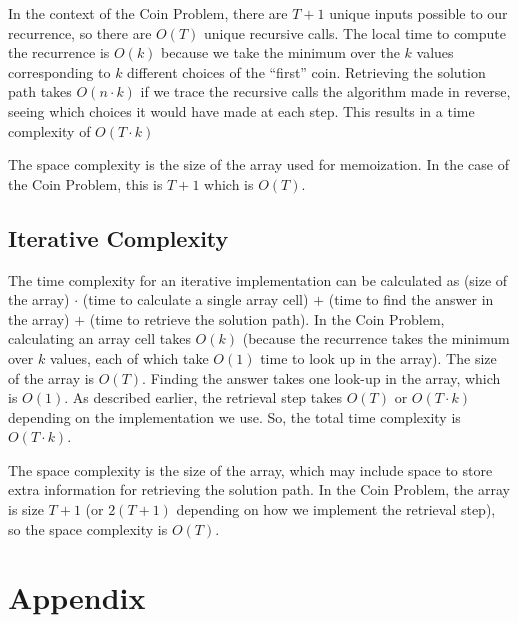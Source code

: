 \documentclass[11pt]{article}
\DeclareRobustCommand{\bigO}{%
    O
}
\begin{document}
In the context of the Coin Problem, there are $T+1$ unique inputs possible to our recurrence, so there are $\bigO(T)$ unique recursive calls. The local time to compute the recurrence is $\bigO(k)$ because we take the minimum over the $k$ values corresponding to $k$ different choices of the ``first'' coin. Retrieving the solution path takes $\bigO(n \cdot k)$ if we trace the recursive calls the algorithm made in reverse, seeing which choices it would have made at each step. This results in a time complexity of $\bigO(T \cdot k)$

The space complexity is the size of the array used for memoization. In the case of the Coin Problem, this is $T+1$ which is $\bigO(T)$.

\subsection*{Iterative Complexity}
The time complexity for an iterative implementation can be calculated as (size of the array) $\cdot$ (time to calculate a single array cell) $+$ (time to find the answer in the array) $+$ (time to retrieve the solution path). In the Coin Problem, calculating an array cell takes $\bigO(k)$ (because the recurrence takes the minimum over $k$ values, each of which take $\bigO(1)$ time to look up in the array). The size of the array is $\bigO(T)$. Finding the answer takes one look-up in the array, which is $\bigO(1)$. As described earlier, the retrieval step takes $\bigO(T)$ or $\bigO(T \cdot k)$ depending on the implementation we use. So, the total time complexity is $\bigO(T \cdot k)$.

The space complexity is the size of the array, which may include space to store extra information for retrieving the solution path. In the Coin Problem, the array is size $T+1$ (or $2(T+1)$ depending on how we implement the retrieval step), so the space complexity is $\bigO(T)$.

\setcounter{section}{1}
\renewcommand{\thesection}{\Alph{section}}
\section*{Appendix}
\end{document}
